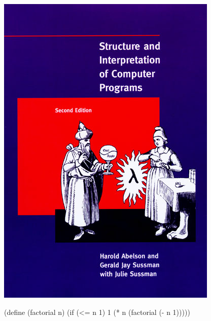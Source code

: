 \documentclass[UKenglish,usenames,dvipsnames,svgnames,table,aspectratio=169,mathserif]{beamer}
\begin{document}
\begin{frame}
\centering
\includegraphics{sicp.jpg}
\end{frame}


\begin{frame}[fragile]
\begin{schemecode}
(define (factorial n)
  (if (<= n 1)
      1
      (* n (factorial (- n 1)))))
\end{schemecode}
\end{frame}

\end{document}
